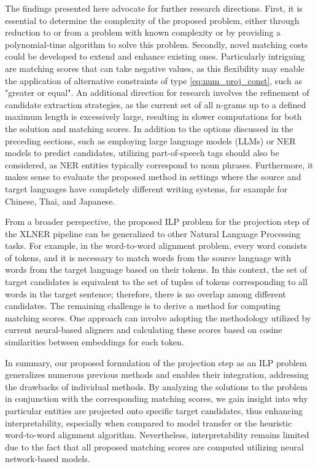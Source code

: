 The findings presented here advocate for further research directions.
First, it is essential to determine the complexity of the proposed problem, either through
reduction to or from a problem with known complexity or by providing a polynomial-time algorithm to solve this problem.
Secondly, novel matching costs could be developed to extend and enhance existing ones. Particularly
intriguing are matching scores that can take negative values, as this flexibility may enable the
application of alternative constraints of type \eqref{eq:num_proj_const}, such as "greater or equal".
An additional direction for research involves the refinement of candidate extraction strategies,
as the current set of all n-grams up to a defined maximum length is excessively large, resulting
in slower computations for both the solution and matching scores. In addition to the options
discussed in the preceding sections, such as employing large language models (LLMs) or NER models
to predict candidates, utilizing part-of-speech tags should also be considered, as NER entities
typically correspond to noun phrases. Furthermore, it makes sense to evaluate the proposed method in
settings where the source and target languages have completely different writing systems, for example
for Chinese, Thai, and Japanese.

From a broader perspective, the proposed ILP problem for the projection step of the XLNER pipeline
can be generalized to other Natural Language Processing tasks. For example, in the word-to-word
alignment problem, every word consists of tokens, and it is necessary to match words from the source
language with words from the target language based on their tokens. In this context, the set of target
candidates is equivalent to the set of tuples of tokens corresponding to all words in the target
sentence; therefore, there is no overlap among different candidates. The remaining challenge
is to derive a method for computing matching scores. One approach can involve adopting the methodology
utilized by current neural-based aligners and calculating these scores based on cosine similarities
between embeddings for each token.

In summary, our proposed formulation of the projection step as an ILP problem generalizes numerous
previous methods and enables their integration, addressing the drawbacks of individual methods.
By analyzing the solutions to the problem in conjunction with the corresponding matching scores,
we gain insight into why particular entities are projected onto specific target candidates, thus
enhancing interpretability, especially when compared to model transfer or the heuristic word-to-word
alignment algorithm. Nevertheless, interpretability remains limited due to the fact that all
proposed matching scores are computed utilizing neural network-based models.
